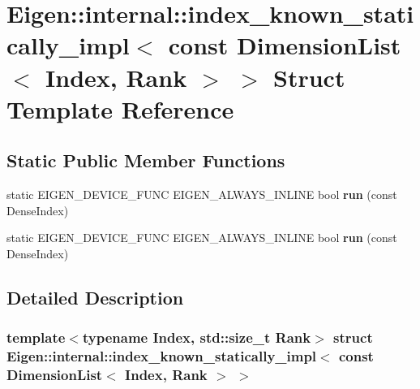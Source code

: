 \hypertarget{struct_eigen_1_1internal_1_1index__known__statically__impl_3_01const_01_dimension_list_3_01_index_00_01_rank_01_4_01_4}{}\section{Eigen\+:\+:internal\+:\+:index\+\_\+known\+\_\+statically\+\_\+impl$<$ const Dimension\+List$<$ Index, Rank $>$ $>$ Struct Template Reference}
\label{struct_eigen_1_1internal_1_1index__known__statically__impl_3_01const_01_dimension_list_3_01_index_00_01_rank_01_4_01_4}
\subsection*{Static Public Member Functions}
\begin{DoxyCompactItemize}
\item 
\mbox{\label{struct_eigen_1_1internal_1_1index__known__statically__impl_3_01const_01_dimension_list_3_01_index_00_01_rank_01_4_01_4_a40c4fdfa4c2e09d644967636722ad875}} 
static E\+I\+G\+E\+N\+\_\+\+D\+E\+V\+I\+C\+E\+\_\+\+F\+U\+NC E\+I\+G\+E\+N\+\_\+\+A\+L\+W\+A\+Y\+S\+\_\+\+I\+N\+L\+I\+NE bool {\bfseries run} (const Dense\+Index)
\item 
\mbox{\label{struct_eigen_1_1internal_1_1index__known__statically__impl_3_01const_01_dimension_list_3_01_index_00_01_rank_01_4_01_4_a40c4fdfa4c2e09d644967636722ad875}} 
static E\+I\+G\+E\+N\+\_\+\+D\+E\+V\+I\+C\+E\+\_\+\+F\+U\+NC E\+I\+G\+E\+N\+\_\+\+A\+L\+W\+A\+Y\+S\+\_\+\+I\+N\+L\+I\+NE bool {\bfseries run} (const Dense\+Index)
\end{DoxyCompactItemize}


\subsection{Detailed Description}
\subsubsection*{template$<$typename Index, std\+::size\+\_\+t Rank$>$\newline
struct Eigen\+::internal\+::index\+\_\+known\+\_\+statically\+\_\+impl$<$ const Dimension\+List$<$ Index, Rank $>$ $>$}



